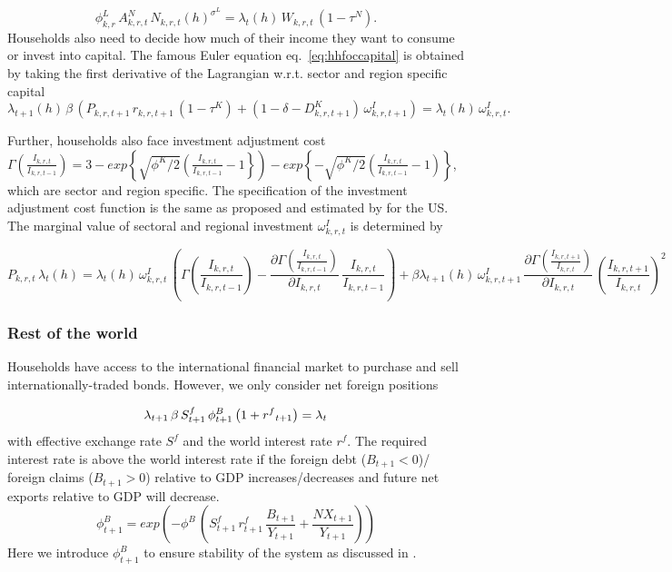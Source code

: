 \documentclass[10pt,a4paper]{article}
\begin{document}
\begin{dmath}\label{eq:hhlaboursupply}
\phi^{L}_{k,r} \, A^{N}_{k,r,t} \, N_{k,r,t}(h)^{\sigma^{L}} = \lambda_{t}(h) \, W_{k,r,t} \, (1 - \tau^{N}).
\end{dmath}
Households also need to decide how much of their income they want to consume or invest into capital. The famous Euler equation eq.~\ref{eq:hhfoccapital} is obtained by taking the first derivative of the Lagrangian w.r.t. sector and region specific capital
\begin{dmath}\label{eq:hhfoccapital}
\lambda_{t+1}(h) \, \beta \, \left(P_{k,r,t+1} \, r_{k,r,t+1} \, (1 - \tau^K) + (1 - \delta - D^{K}_{k,r,t+1}) \, \omega^{I}_{k,r,t+1} \right) = \lambda_{t}(h) \, \omega^{I}_{k,r,t}.
\end{dmath}

Further, households also face investment adjustment cost $\Gamma(\frac{I_{k,r,t}}{I_{k,r,t-1}}) = 3 - exp\left\lbrace\sqrt{\phi^{K}/2}\left(\frac{I_{k,r,t}}{I_{k,r,t-1}}-1\right\rbrace\right) - exp\left\lbrace-\sqrt{\phi^{K}/2}\left(\frac{I_{k,r,t}}{I_{k,r,t-1}}-1\right)\right\rbrace$, which are sector and region specific. The specification of the investment adjustment cost function is the same as proposed and estimated by \cite{christiano2014risk} for the US.  The marginal value of sectoral and regional investment $\omega^{I}_{k,r,t}$ is determined by

\begin{dmath}\label{eq:hhfocinvestment}
P_{k,r,t} \, \lambda_{t}(h) = \lambda_{t}(h) \, \omega^{I}_{k,r,t} \, \left(\Gamma(\frac{I_{k,r,t}}{I_{k,r,t-1}}) - \frac{\partial \Gamma(\frac{I_{k,r,t}}{I_{k,r,t-1}})}{\partial I_{k,r,t}} \, \frac{I_{k,r,t}}{I_{k,r,t-1}} \right) + \beta \lambda_{t+1}(h) \, \omega^{I}_{k,r,t+1} \, \frac{\partial \Gamma(\frac{I_{k,r,t+1}}{I_{k,r,t}})}{\partial I_{k,r,t}} \, \left(\frac{I_{k,r,t+1}}{I_{k,r,t}}\right)^2
\end{dmath}

\subsubsection{Rest of the world}
Households have access to the international financial market to purchase and sell internationally-traded bonds. However, we only consider net foreign positions 

\begin{dmath}\label{eq:hhfocbonds}
\lambda_{t+1} \, \beta \, S^{f}_{t+1} \, \phi^{B}_{t+1} \left(1+{{r^{f}}_{t+1}}\right) = \lambda_{t} \\
\end{dmath}
with effective exchange rate $S^f$ and the world interest rate $r^f$.
The required interest rate is above the world interest rate if the foreign debt ($B_{t+1}<0$)/ foreign claims ($B_{t+1}>0$) relative to GDP increases/decreases and future net exports relative to GDP will decrease. 
\begin{dmath}
\phi^{B}_{t+1} = exp \left(-\phi^B \,(S^{f}_{t+1} \, r^{f}_{t+1} \, \frac{B_{t+1}}{Y_{t+1}}+\frac{NX_{t+1}}{Y_{t+1}})\right)
\end{dmath}
Here we introduce $\phi^{B}_{t+1}$ to ensure stability of the system as discussed in \cite{schmitt2003closing}.
\end{document}
